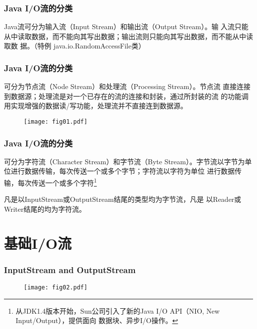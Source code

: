 \begin{frame}[fragile] %
  \frametitle{Java I/O流的分类}


  {\hei Java流可分为输入流（Input Stream）和输出流（Output Stream）。}输
  入流只能从中读取数据，而不能向其写出数据；输出流则只能向其写出数据，而不能从中读取数
  据。{\Mage （特例 java.io.RandomAccessFile类）}

\end{frame}

\begin{frame}[fragile] %
  \frametitle{Java I/O流的分类}


  {\hei 可分为节点流（Node Stream）和处理流（Processing Stream）。}节点流
  直接连接到数据源；处理流是对一个已存在的流的连接和封装，通过所封装的流
  的功能调用实现增强的数据读/写功能，处理流并不直接连到数据源。

  \begin{figure}
    \centering
    \texttt{[image: fig01.pdf]}
  \end{figure}
\end{frame}

\begin{frame}[fragile] %
  \frametitle{Java I/O流的分类}


  {\hei 可分为字符流（Character Stream）和字节流（Byte
    Stream）。}字节流以字节为单位进行数据传输，每次传送一个或多个字节；字符流以字符为单位
  进行数据传输，每次传送一个或多个字符\footnote{从JDK1.4版本开始，Sun公司引入了新的Java I/O API（NIO, New Input/Output），提供面向
    数据块、异步I/O操作。}


  凡是以InputStream或OutputStream结尾的类型均为{\hei 字节流}，凡是
  以Reader或Writer结尾的均为{\hei 字符流。}
\end{frame}

\section{基础I/O流}

\begin{frame}[fragile] %
\frametitle{InputStream and OutputStream}

\begin{figure}
\centering
\texttt{[image: fig02.pdf]}
\end{figure}
\end{frame}

